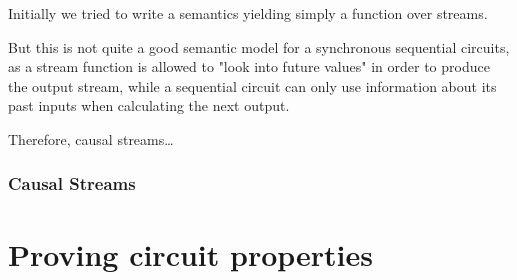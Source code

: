             Initially we tried to write a semantics yielding simply a function over streams.

            But this is not quite a good semantic model for a synchronous sequential circuits,
            as a stream function is allowed to "look into future values" in order to produce
            the output stream, while a sequential circuit can only use information about its past inputs
            when calculating the next output.

            Therefore, causal streams\ldots

            \subsubsection{Causal Streams}
            \label{subsubsec:causal-streams}

    \section{Proving circuit properties}
    \label{sec:proving-circuit-properties}
